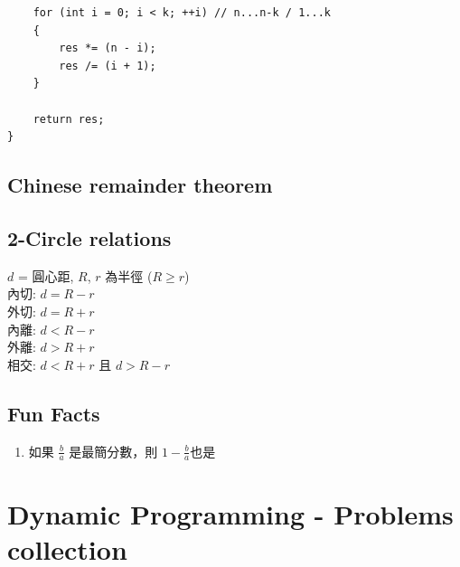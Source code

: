 \documentclass[10pt,oneside]{article}
\begin{document}
\begin{landscape}
\begin{multicols}{2}
\begin{verbatim}
    for (int i = 0; i < k; ++i) // n...n-k / 1...k
    {
        res *= (n - i);
        res /= (i + 1);
    }
    
    return res;
}
\end{verbatim}

\subsection{Chinese remainder theorem}

\subsection{2-Circle relations}

{\normalsize 
$d$ = 圓心距, $R$, $r$ 為半徑 ($R \geq r$)\\
內切: $d = R - r$\\
外切: $d = R + r$\\
內離: $d < R - r$\\
外離: $d > R + r$\\
相交: $d < R + r$ 且 $d > R - r$
}

\subsection{Fun Facts}

{\normalsize 
\begin{enumerate}
	\item 如果 $\frac b a$ 是最簡分數，則 $1 - \frac b a$也是%
\end{enumerate}
}


\section{Dynamic Programming - Problems collection}

% 

\end{multicols}
\end{landscape}
\end{document}
